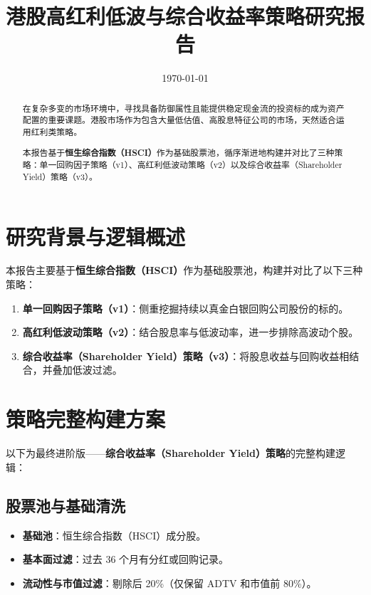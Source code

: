 \documentclass[10pt,a4paper]{ctexart}
\title{\textbf{港股高红利低波与综合收益率策略研究报告}}
\author{}
\date{\today}
\begin{document}
\maketitle

\begin{abstract}
在复杂多变的市场环境中，寻找具备防御属性且能提供稳定现金流的投资标的成为资产配置的重要课题。港股市场作为包含大量低估值、高股息特征公司的市场，天然适合运用红利类策略。

本报告基于\textbf{恒生综合指数（HSCI）}作为基础股票池，循序渐进地构建并对比了三种策略：单一回购因子策略（v1）、高红利低波动策略（v2）以及综合收益率（Shareholder Yield）策略（v3）。
\end{abstract}

\section{研究背景与逻辑概述}

本报告主要基于\textbf{恒生综合指数（HSCI）}作为基础股票池，构建并对比了以下三种策略：
\begin{enumerate}[label=1.\arabic*]
    \item \textbf{单一回购因子策略（v1）}：侧重挖掘持续以真金白银回购公司股份的标的。
    \item \textbf{高红利低波动策略（v2）}：结合股息率与低波动率，进一步排除高波动个股。
    \item \textbf{综合收益率（Shareholder Yield）策略（v3）}：将股息收益与回购收益相结合，并叠加低波过滤。
\end{enumerate}

\section{策略完整构建方案}

以下为最终进阶版——\textbf{综合收益率（Shareholder Yield）策略}的完整构建逻辑：

\subsection{股票池与基础清洗}
\begin{itemize}
    \item \textbf{基础池}：恒生综合指数（HSCI）成分股。
    \item \textbf{基本面过滤}：过去 36 个月有分红或回购记录。
    \item \textbf{流动性与市值过滤}：剔除后 20\%（仅保留 ADTV 和市值前 80\%）。
\end{itemize}
\end{document}
